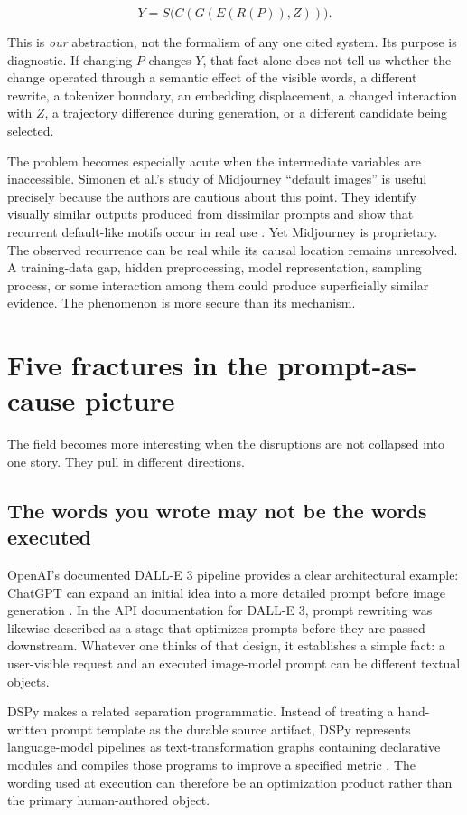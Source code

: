 \documentclass[11pt]{article}
\begin{document}
\[
Y = S\big(C(G(E(R(P)), Z))\big).
\]

This is \emph{our} abstraction, not the formalism of any one cited system. Its purpose is diagnostic. If changing \(P\) changes \(Y\), that fact alone does not tell us whether the change operated through a semantic effect of the visible words, a different rewrite, a tokenizer boundary, an embedding displacement, a changed interaction with \(Z\), a trajectory difference during generation, or a different candidate being selected.

The problem becomes especially acute when the intermediate variables are inaccessible. Simonen et al.'s study of Midjourney ``default images'' is useful precisely because the authors are cautious about this point. They identify visually similar outputs produced from dissimilar prompts and show that recurrent default-like motifs occur in real use \citep{Simonen2026DefaultImages}. Yet Midjourney is proprietary. The observed recurrence can be real while its causal location remains unresolved. A training-data gap, hidden preprocessing, model representation, sampling process, or some interaction among them could produce superficially similar evidence. The phenomenon is more secure than its mechanism.

\section{Five fractures in the prompt-as-cause picture}

The field becomes more interesting when the disruptions are not collapsed into one story. They pull in different directions.

\subsection{The words you wrote may not be the words executed}

OpenAI's documented DALL-E 3 pipeline provides a clear architectural example: ChatGPT can expand an initial idea into a more detailed prompt before image generation \citep{OpenAI2023DALLE3}. In the API documentation for DALL-E 3, prompt rewriting was likewise described as a stage that optimizes prompts before they are passed downstream. Whatever one thinks of that design, it establishes a simple fact: a user-visible request and an executed image-model prompt can be different textual objects.

DSPy makes a related separation programmatic. Instead of treating a hand-written prompt template as the durable source artifact, DSPy represents language-model pipelines as text-transformation graphs containing declarative modules and compiles those programs to improve a specified metric \citep{Khattab2023DSPy}. The wording used at execution can therefore be an optimization product rather than the primary human-authored object.
\end{document}
